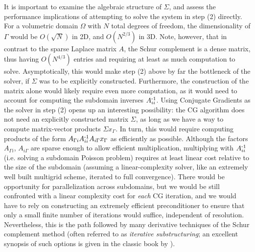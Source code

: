  It is important to examine the algebraic structure of $\Sigma$, and assess the performance implications of attempting to solve the system in step (2) directly.
 For a volumetric
domain $\Omega$ with $N$ total degrees of freedom, the dimensionality of $\Gamma$ would be $O(\sqrt{N})$ in 2D, and $O(N^{2/3})$ in 3D. Note, however, that in contrast to the
sparse Laplace matrix $A$, the Schur complement is a dense matrix, thus having $O(N^{4/3})$ entries and requiring at least as much computation to solve. Asymptotically, this would
make step (2) above by far the bottleneck of the solver, if $\Sigma$ was to be explicitly constructed. Furthermore, the construction of the matrix alone would likely require even
more computation, as it would need to account for computing the subdomain inverses $A_{ii}^{\operatorname{-1}}$. Using Conjugate Gradients as the solver in step (2) opens up an interesting
possibility: the CG algorithm does not need an explicitly constructed matrix $\Sigma$, as long as we have a way to compute matrix-vector products $\Sigma x_\Gamma$. In turn, this
would require computing products of the form $A_{\Gamma i}A_{ii}^{\operatorname{-1}}A_{i\Gamma}x_\Gamma$ as efficiently as possible. Although the factors $A_{\Gamma i}$, $A_{i\Gamma}$ are
sparse enough to allow efficient multiplication, multiplying with $A_{ii}^{\operatorname{-1}}$ (i.e. solving a subdomain Poisson problem) requires at least linear cost relative to the size
of the subdomain (assuming a linear-complexity solver, like an extremely well built multigrid scheme, iterated to full convergence). There would be opportunity for parallelization
across subdomains, but we would be still confronted with a linear complexity cost for \emph{each} CG iteration, and we would have to rely on constructing an extremely efficient
preconditioner to ensure that only a small finite number of iterations would suffice, independent of resolution. Nevertheless, this is the
  path followed by many derivative techniques
of the Schur complement method (often referred to as \emph{iterative substructuring}; an excellent synopsis of such options is given in the classic book by \cite{quarteroni:1999:domain}).

